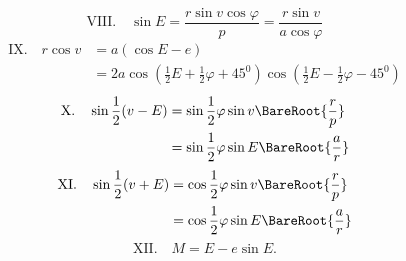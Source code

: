 \[
\mathrm{VIII.}\quad\sin E=\frac{r\sin v\cos\varphi}{p}=\frac{r\sin v}{a\cos\varphi}
\]
\[
\begin{aligned}
\mathrm{IX.}\quad r\cos v&=a(\cos E-e)\\
&=2a\cos(\frac{1}{2}E+\frac{1}{2}\varphi+45^0)\cos(\frac{1}{2}E-\frac{1}{2}\varphi-45^0)
\end{aligned}
\]
\[
\begin{aligned}
\mathrm{X.}\quad\sin\frac{1}{2}(v-E)&=\sin\frac{1}{2}\varphi\sin v\BareRoot{\frac{r}{p}}\\
&=\sin\frac{1}{2}\varphi\sin E\BareRoot{\frac{a}{r}}
\end{aligned}
\]
\[
\begin{aligned}
\mathrm{XI.}\quad\sin\frac{1}{2}(v+E)&=\cos\frac{1}{2}\varphi\sin v\BareRoot{\frac{r}{p}}\\
&=\cos\frac{1}{2}\varphi\sin E\BareRoot{\frac{a}{r}}
\end{aligned}
\]
\[
\mathrm{XII.}\quad M=E-e\sin E.
\]
